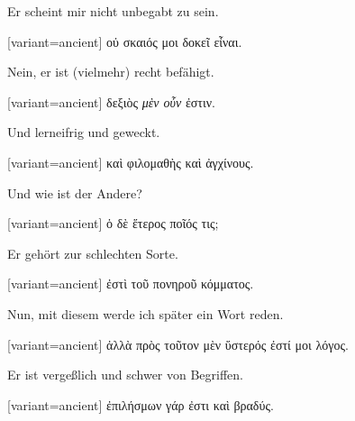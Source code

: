 Er scheint mir nicht unbegabt zu sein. 

\switchcolumn

\begin{greek}[variant=ancient]%
οὐ σκαιός μοι δοκεῖ εἶναι.

\end{greek}%
\switchcolumn*

Nein, er ist (vielmehr) recht befähigt. 

\switchcolumn

\begin{greek}[variant=ancient]%
δεξιὸς \emph{μὲν οὖν} ἐστιν.

\end{greek}%
\switchcolumn*

Und lerneifrig und geweckt. 

\switchcolumn

\begin{greek}[variant=ancient]%
καὶ φιλομαθὴς καὶ ἀγχίνους.

\end{greek}%
\switchcolumn*

Und wie ist der Andere? 

\switchcolumn

\begin{greek}[variant=ancient]%
ὁ δὲ ἕτερος ποῖός τις;

\end{greek}%
\switchcolumn*

Er gehört zur schlechten Sorte. 

\switchcolumn

\begin{greek}[variant=ancient]%
ἐστὶ τοῦ πονηροῦ κόμματος.

\end{greek}%
\switchcolumn*

Nun, mit diesem werde ich später ein Wort reden. 

\switchcolumn

\begin{greek}[variant=ancient]%
ἀλλὰ πρὸς τοῦτον μὲν ὕστερός ἐστί μοι λόγος.

\end{greek}%
\switchcolumn*

Er ist vergeßlich und schwer von Begriffen. 

\switchcolumn

\begin{greek}[variant=ancient]%
ἐπιλήσμων γάρ ἐστι καὶ βραδύς.

\end{greek}%
\switchcolumn*


